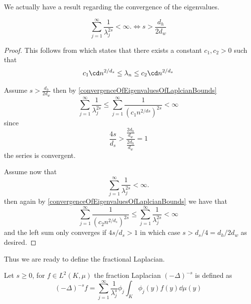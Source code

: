 We actually have a result regarding the convergence of the eigenvalues.

\begin{lemma}\label{convergenceOfEigenvaluesOfLaplacian}
	\begin{equation}
		\sum_{j = 1}^{\infty} \frac{1}{\lambda_{j}^{2s}} < \infty. \iff s > \frac{d_h}{2d_w}
	\end{equation}
\end{lemma}
\begin{proof}
	This follows from \cite[lemma 5.1.3]{Kigami_2001} which states that there exists a constant $c_1, c_2 >0$ such that 
	\begin{equation} \label{convergenceOfEigenvaluesOfLaplcianBounds}
			c_1\cd n^{2/d_s} \leq \lambda_{n} \leq c_2\cd n^{2/d_s}
	\end{equation}

	
	Assume $s > \frac{d_h}{2d_w}$ then by \eqref{convergenceOfEigenvaluesOfLaplcianBounds}
	\begin{equation}
		\sum_{j = 1}^{\infty} \frac{1}{\lambda_j^{2s}} \leq \sum_{j = 1}^{\infty} \frac{1}{(c_1 n^{2/ds})^{2s}} < \infty
	\end{equation}
	since 
	\begin{equation}
		\frac{4s}{d_s} > \frac{\frac{2d_h}{d_w}}{\frac{2d_h}{d_w}} = 1
	\end{equation}
	the series is convergent.
	
	Assume now that 
	\begin{equation}
		\sum_{j = 1}^{\infty} \frac{1}{\lambda_{j}^{2s}} < \infty.
	\end{equation}
	then again by \eqref{convergenceOfEigenvaluesOfLaplcianBounds} we have that
	\begin{equation}
						\sum_{j = 1}^{\infty} \frac{1}{(c_2 n^{2/d_s})^{2s}} \leq \sum_{j = 1}^{\infty} \frac{1}{\lambda_{j}^{2s}} < \infty
	\end{equation}
	and the left sum only converges if $4s/d_s > 1$ in which case $s > d_s/4 = d_h/2d_w$ as desired.
\end{proof}



Thus we are ready to define the fractional Laplacian. 
\begin{defi}
	Let $s \geq 0$, for $f \in L^2(K, \mu)$ the fraction Laplacian $(-\Delta)^{-s}$ is defined as
	\begin{equation}
		(-\Delta)^{-s}f = \sum_{j = 1}^{\infty} \frac{1}{\lambda_{j}^{s}} \phi_j \int_{K} \phi_j(y)f(y) \dd \mu(y)
	\end{equation}
\end{defi}

